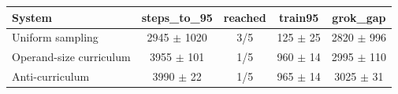 \begin{tabular}{lcccc}
\toprule
System & steps\_to\_95 & reached & train95 & grok\_gap \\
\midrule
Uniform sampling & 2945 $\pm$ 1020 & 3/5 & 125 $\pm$ 25 & 2820 $\pm$ 996 \\
Operand-size curriculum & 3955 $\pm$ 101 & 1/5 & 960 $\pm$ 14 & 2995 $\pm$ 110 \\
Anti-curriculum & 3990 $\pm$ 22 & 1/5 & 965 $\pm$ 14 & 3025 $\pm$ 31 \\
\bottomrule
\end{tabular}
